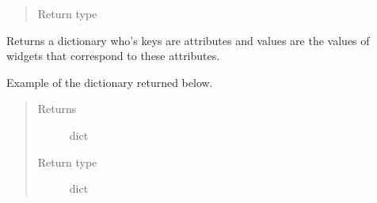 \documentclass[letterpaper,10pt,english]{sphinxmanual}
\begin{document}
\begin{fulllineitems}
\begin{fulllineitems}
\begin{quote}
\begin{description}
\item[{Return type}] \leavevmode
{\hyperref[\detokenize{polo.windows:polo.windows.run_importer.ImportCandidate}]{}}

\end{description}\end{quote}

\end{fulllineitems}


\begin{fulllineitems}
\label{\detokenize{polo.windows:polo.windows.run_importer.RunImporterDialog.selection_dict}}
Returns a dictionary who’s keys are  attributes and values
are the values of {\hyperref[\detokenize{polo.windows:polo.windows.run_importer.RunImporterDialog}]{}} widgets that correspond to
these attributes.

Example of the dictionary returned below.

\begin{sphinxVerbatim}[commandchars=\\\{\}]
     
     
     
     
\end{sphinxVerbatim}
\begin{quote}\begin{description}
\item[{Returns}] \leavevmode
dict

\item[{Return type}] \leavevmode
dict

\end{description}\end{quote}

\end{fulllineitems}


\end{fulllineitems}
\end{document}
